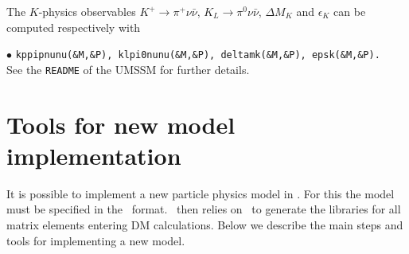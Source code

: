 \documentclass[12pt,a4paper]{article}
\begin{document}
The $K$-physics observables $K^+ \to \pi^+\nu\bar{\nu}$, $K_L \to \pi^0 \nu\bar{\nu}$, $\Delta M_K$ and $\epsilon_K$ can be computed respectively with

\noindent
$\bullet$ {\tt kppipnunu(\&M,\&P), klpi0nunu(\&M,\&P), deltamk(\&M,\&P), epsk(\&M,\&P).}\\ 

\noindent
See the \verb|README| of the UMSSM for further details.


\section{Tools for new model implementation}


It is possible to  implement a new particle physics  model  in \micro.
For this the model must be specified in the
\calchep\ format. \micro\ then relies on \calchep\ 
to generate the libraries for all matrix elements entering DM calculations. 
Below we describe the main steps and tools for implementing a new model.
\end{document}
